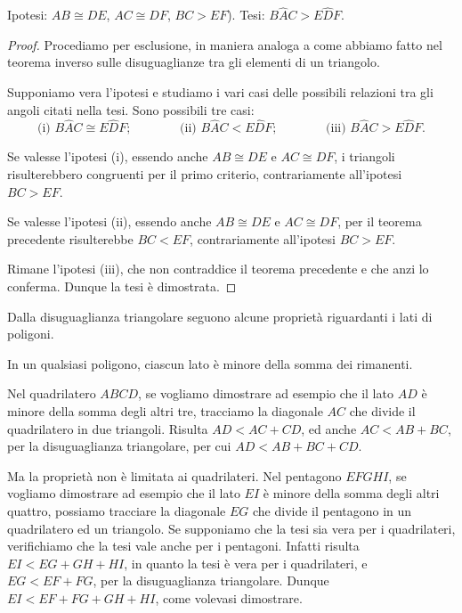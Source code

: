 \noindent Ipotesi: $AB\cong DE$, $AC\cong DF$, $BC>EF$). Tesi: $B\widehat{A}C>E\widehat{D}F$.

\begin{proof}
Procediamo per esclusione, in maniera analoga a come abbiamo fatto nel teorema inverso sulle disuguaglianze tra gli elementi di un triangolo.

Supponiamo vera l'ipotesi e studiamo i vari casi delle possibili relazioni tra gli angoli citati nella tesi. Sono possibili tre casi:
\[\text{(i) }B\widehat{A}C\cong E\widehat{D}F\text{;}\qquad\qquad \text{(ii) }B\widehat{A}C<E\widehat{D}F\text{;}\qquad\qquad \text{(iii) }B\widehat{A}C>E\widehat{D}F\text{.}\]

Se valesse l'ipotesi (i), essendo anche $AB\cong DE$ e $AC\cong DF$, i triangoli risulterebbero congruenti per il primo criterio, contrariamente all'ipotesi $BC>EF$.

Se valesse l'ipotesi (ii), essendo anche $AB\cong DE$ e $AC\cong DF$, per il teorema precedente risulterebbe $BC<EF$, contrariamente all'ipotesi $BC>EF$.

Rimane l'ipotesi (iii), che non contraddice il teorema precedente e che anzi lo conferma. Dunque la tesi è dimostrata.
\end{proof}

Dalla disuguaglianza triangolare seguono alcune proprietà riguardanti i lati di poligoni.

\begin{teorema}
In un qualsiasi poligono, ciascun lato è minore della somma dei rimanenti.
\end{teorema}

Nel quadrilatero $ABCD$, se vogliamo dimostrare ad esempio che il lato $AD$ è minore della somma degli altri tre, tracciamo la diagonale $AC$ che divide il quadrilatero in due triangoli. Risulta $AD<AC+CD$, ed anche $AC<AB+BC$, per la disuguaglianza triangolare, per cui $AD<AB+BC+CD$.

Ma la proprietà non è limitata ai quadrilateri. Nel pentagono $EFGHI$, se vogliamo dimostrare ad esempio che il lato $EI$ è minore della somma degli altri quattro, possiamo tracciare la diagonale $EG$ che divide il pentagono in un quadrilatero ed un triangolo. Se supponiamo che la tesi sia vera per i quadrilateri, verifichiamo che la tesi vale anche per i pentagoni. Infatti risulta $EI<EG+GH+HI$, in quanto la tesi è vera per i quadrilateri, e $EG<EF+FG$, per la disuguaglianza triangolare. Dunque $EI<EF+FG+GH+HI$, come volevasi dimostrare.

